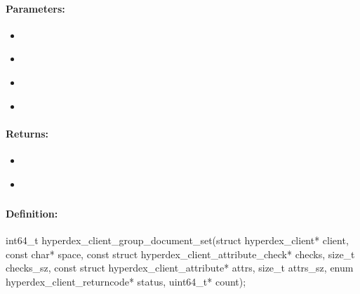 \paragraph{Parameters:}
\begin{itemize}[noitemsep]
\item {}\\

\item {}\\

\item {}\\

\item {}\\

\end{itemize}

\paragraph{Returns:}
\begin{itemize}[noitemsep]
\item {}\\

\item {}\\

\end{itemize}

\pagebreak
\subsubsection{}
\label{api:c:group_document_set}


\paragraph{Definition:}
\begin{ccode}
int64_t hyperdex_client_group_document_set(struct hyperdex_client* client,
        const char* space,
        const struct hyperdex_client_attribute_check* checks, size_t checks_sz,
        const struct hyperdex_client_attribute* attrs, size_t attrs_sz,
        enum hyperdex_client_returncode* status,
        uint64_t* count);
\end{ccode}

